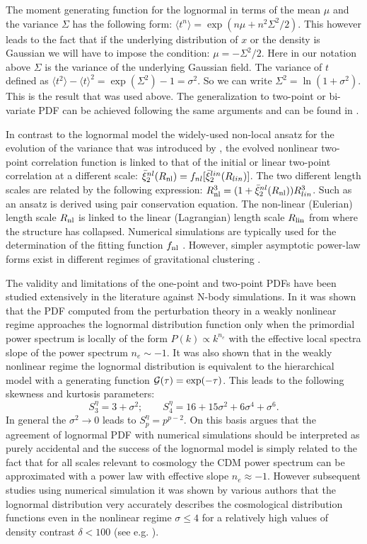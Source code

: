 \documentclass[usenatbib]{mn2e}
\def\la{\langle}
\def\ra{\rangle}
\def\be{\begin{equation}}
\def\ee{\end{equation}}
\def\be{\begin{equation}}
\def\ee{\end{equation}}
\begin{document}
The moment generating function for the lognormal in terms of the mean $\mu$ and the variance $\Sigma$ has the
following form: $\la t^n \ra = \exp(n\mu + n^2 \Sigma^2/2)$.
%
This however leads to the fact
that if the underlying distribution of $x$ or the density is Gaussian we will have to impose the
condition: $\mu=-\Sigma^2/2$. Here in our notation above $\Sigma$ is the variance of the underlying
Gaussian field. The variance of $t$ defined as $\la t^2 \ra - \la t \ra^2 = \exp(\Sigma^2) -1 = \sigma^2$. So we can write
$\Sigma^2 = \ln(1+\sigma^2)$. This is the result that was used above. The generalization to
two-point or bi-variate PDF can be achieved following the same arguments and can be found in \citep{KTS01}.

In contrast to the lognormal model the widely-used non-local ansatz for the evolution of the variance that
was introduced by \citep{HKLM}, the evolved nonlinear two-point correlation function is
linked to that of the initial or linear two-point correlation at a different scale: 
$\bar\xi_2^{nl}(R_{\rm nl})=f_{nl}[\bar\xi_2^{lin}(R_{lin})]$. The two different length scales are related by the following
expression: $R_{\rm nl}^3= (1+\bar\xi^{nl}_2(R_{\rm nl}))R_{lin}^3$. Such as an ansatz is derived using pair conservation equation.
The non-linear (Eulerian) length scale $R_{\rm nl}$ is linked to the linear (Lagrangian) 
length scale $R_{\rm lin}$ from where the 
structure has collapsed. Numerical simulations are typically used for the determination of 
the fitting function $f_{\rm nl}$  \citep{PD94}. However, simpler asymptotic power-law 
forms exist in different regimes of gravitational clustering \citep{MuPa97}.
%

The validity and limitations of the one-point and two-point PDFs have been 
studied extensively in the literature against N-body simulations. 
In \cite{B92,B94} it was shown that the PDF computed from the perturbation theory
in a weakly nonlinear regime approaches the lognormal distribution function only when
the primordial power spectrum is locally of the form $P(k) \propto k^{n_{e}}$ with the
effective local spectra slope of the power spectrum $n_{e} \sim -1$. It was also
shown that in the weakly nonlinear regime the lognormal distribution is equivalent
to the hierarchical model with a generating function $\cal G(\tau) = \exp(-\tau)$.
This leads to the following skewness and kurtosis parameters: 
\be
S^{\eta}_3 = 3 + \sigma^2; \quad\quad  S^{\eta}_4 = 16 + 15\sigma^2 + 6 \sigma^4 + \sigma^6.
\ee
In general the $\sigma^2 \rightarrow 0$ leads to  $S_p^{\eta} = p^{p-2}$. 
On this basis \cite{BK95} argues that the agreement of lognormal PDF with
numerical simulations should be interpreted as purely accidental and the
success of the lognormal model is simply related to the fact that for all
scales relevant to cosmology the CDM power spectrum can be approximated with
a power law with effective slope $n_{e} \approx -1$. However subsequent 
studies using numerical simulation it was shown by various authors  
 that the lognormal distribution very accurately describes the cosmological
distribution functions even in the nonlinear regime $\sigma \le 4$ for a relatively 
high values of density contrast $\delta < 100$ (see e.g. \cite{KTS01}). 
\end{document}
